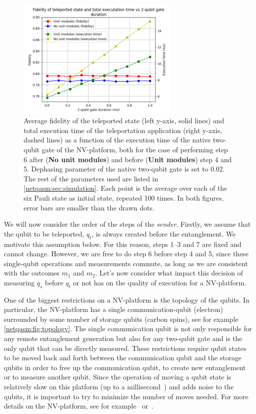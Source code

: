 \begin{figure}[t]
    \centering
    \includegraphics[width=0.7\textwidth]{figures/netqasm/plots/paper_teleport_sweep_gate_time.png}
    \caption{
        Average fidelity of the teleported state (left y-axis, solid lines) and total
        execution time of the teleportation application (right y-axis, dashed
        lines) as a function of the execution time of the native two-qubit gate
        of the NV-platform, both for the case of performing step 6 after
        (\textbf{No unit modules}) and before (\textbf{Unit modules}) step 4 and
        5. Dephasing parameter of the native two-qubit gate is set to 0.02. The
        rest of the parameters used are listed in \cref{netqasm:sec:simulation}. Each
        point is the average over each of the six Pauli state as initial state,
        repeated 100 times. In both figures, error bars are smaller than the drawn
        dots.}
  \label{netqasm:fig:sweep_gate_time}
\end{figure}

We will now consider the order of the steps of the \textit{sender}.
Firstly, we assume that the qubit to be teleported, $q_t$, is always created before the entanglement.
We motivate this assumption below. For this reason, steps 1--3 and 7 are fixed and cannot change.
However, we are free to do step 6 before step 4 and 5, since these single-qubit operations and measurements commute, as long as we are consistent with the outcomes $m_1$ and $m_2$.
Let's now consider what impact this decision of measuring $q_s$ before $q_t$ or not has on the quality of execution for a NV-platform.

One of the biggest restrictions on a NV-platform is the topology of the qubits.
In particular, the NV-platform has a single communication-qubit (electron) surrounded by some number of storage qubits (carbon spins), see for example \cref{netqasm:fig:topology}.
The single communication qubit is not only responsible for any remote entanglement generation but also for any two-qubit gate and is the only qubit that can be directly measured.
These restrictions require qubit states to be moved back and forth between the communication qubit and the storage qubits in order to free up the communication qubit, to create new entanglement or to measure another qubit.
Since the operation of moving a qubit state is relatively slow on this platform (up to a millisecond~\cite{Humphreys2018}) and adds noise to the qubits, it is important to try to minimize the number of moves needed.
For more details on the NV-platform, see for example~\cite{Bernien2014} or~\cite{dahlberg2019linklayer}.

